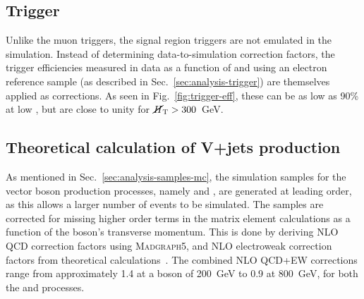 
\subsection{Trigger}
\label{sec:analysis-mccorrections-trigger}
Unlike the muon triggers, the signal region triggers are not emulated in the 
simulation. Instead of determining data-to-simulation correction factors, the 
trigger efficiencies measured in data as a function of \scalht and \mht using 
an electron reference sample (as described in Sec.~\ref{sec:analysis-trigger}) 
are themselves applied as corrections. As seen in 
Fig.~\ref{fig:trigger-eff}, these can be as low as 90\% at low \mht, but 
are close to unity for $\mbox{$\cancel{H}_\text{T}$}>300$~GeV.

\subsection{Theoretical calculation of V+jets production}
\label{sec:analysis-mccorrections-nlo}
As mentioned in Sec.~\ref{sec:analysis-samples-mc}, the simulation samples for 
the vector boson production processes, namely \zj and \wj, are generated at 
leading order, as this allows a larger number of events to be simulated. 
The samples are corrected for missing higher order terms in the matrix element 
calculations as a function of the 
boson's transverse momentum. This is done by deriving NLO QCD correction 
factors using \textsc{Madgraph5}, and NLO electroweak correction factors from 
theoretical calculations~\cite{monojet36fb,nloewk}. The combined NLO QCD+EW 
corrections 
range from approximately 1.4 at a boson \pt of 200~GeV to 0.9 at 800~GeV, for 
both the \zj and \wj processes.



